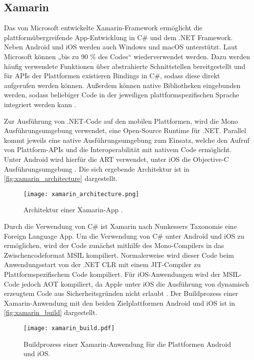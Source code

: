\subsection{Xamarin}
\label{sec:Frameworks_Xamarin}

Das von Microsoft entwickelte Xamarin-Framework ermöglicht die plattformübergreifende App-Entwicklung in C\# und dem .NET Framework.
Neben Android und iOS werden auch Windows und macOS unterstützt.
Laut Microsoft können „bis zu 90 \% des Codes“ \cite{Xamarin_Homepage} wiederverwendet werden.
Dazu werden häufig verwendete Funktionen über abstrahierte Schnittstellen bereitgestellt und für \acp{API} der Plattformen existieren Bindings in C\#, sodass diese direkt aufgerufen werden können.
Außerdem können native Bibliotheken eingebunden werden, sodass beliebiger Code in der jeweiligen plattformspezifischen Sprache integriert werden kann \cite{Xamarin_Android}.


Zur Ausführung von .NET-Code auf den mobilen Plattformen, wird die Mono Ausführungsumgebung verwendet, eine Open-Source Runtime für .NET.
Parallel kommt jeweils eine native Ausführungsumgebung zum Einsatz, welche den Aufruf von Plattform-\acp{API} und die Interoperabilität mit nativem Code ermöglicht.
Unter Android wird hierfür die \ac{ART} verwendet, unter iOS die Objective-C Ausführungsumgebung \cite{Xamarin_iOS,Xamarin_Android}.
Die sich ergebende Architektur ist in \autoref{fig:xamarin_architecture} dargestellt.
\begin{figure}[h]
    \centering
    \texttt{[image: xamarin\_architecture.png]}
    \caption{Architektur einer Xamarin-App \cite{Xamarin_Homepage}.}
    \label{fig:xamarin_architecture}
\end{figure}


Durch die Verwendung von C\# ist Xamarin nach Nunkessers Taxonomie \cite{Nunkesser_Taxonomy_Apps} eine Foreign Language App.
Um die Verwendung von C\# unter Android und iOS zu ermöglichen, wird der Code zunächst mithilfe des Mono-Compilers in das Zwischencodeformat \ac{MSIL} kompiliert.
Normalerweise wird dieser Code beim Anwendungsstart von der .NET \ac{CLR} mit einem \ac{JIT}-Compiler zu Plattformspezifischem Code kompiliert.
Für iOS-Anwendungen wird der \ac{MSIL}-Code jedoch \ac{AOT} kompiliert, da Apple unter iOS die Ausführung von dynamisch erzeugtem Code aus Sicherheitsgründen nicht erlaubt \cite{Xamarin_iOS}.
Der Buildprozess einer Xamarin-Anwendung mit den beiden Zielplattformen Android und iOS ist in \autoref{fig:xamarin_build} dargestellt.
\begin{figure}[h]
    \centering
    \texttt{[image: xamarin\_build.pdf]}
    \caption{Buildprozess einer Xamarin-Anwendung für die Plattformen Android und iOS.}
    \label{fig:xamarin_build}
\end{figure}


